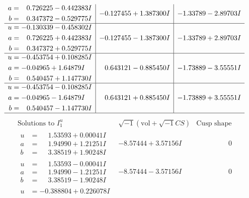\documentclass[1p]{elsarticle_modified}
\theoremstyle{definition}
\newcommand{\I}{\sqrt{-1}}
\begin{document}
$$\begin{array}{c|c|c}
\begin{aligned}
a &= \phantom{-}0.726225 - 0.442383 I \\
b &= \phantom{-}0.347372 - 0.529775 I\end{aligned}
 & -0.127455 + 1.387300 I & -1.33789 - 2.89703 I \\ \hline\begin{aligned}
u &= -0.130339 - 0.458302 I \\
a &= \phantom{-}0.726225 + 0.442383 I \\
b &= \phantom{-}0.347372 + 0.529775 I\end{aligned}
 & -0.127455 - 1.387300 I & -1.33789 + 2.89703 I \\ \hline\begin{aligned}
u &= -0.453754 + 0.108285 I \\
a &= -0.04965 + 1.64879 I \\
b &= \phantom{-}0.540457 + 1.147730 I\end{aligned}
 & \phantom{-}0.643121 - 0.885450 I & -1.73889 - 3.55551 I \\ \hline\begin{aligned}
u &= -0.453754 - 0.108285 I \\
a &= -0.04965 - 1.64879 I \\
b &= \phantom{-}0.540457 - 1.147730 I\end{aligned}
 & \phantom{-}0.643121 + 0.885450 I & -1.73889 + 3.55551 I\\
 \hline 
 \end{array}$$\newpage$$\begin{array}{c|c|c}  
\text{Solutions to }I^u_{1}& \I (\text{vol} + \sqrt{-1}CS) & \text{Cusp shape}\\
 \hline 
\begin{aligned}
u &= \phantom{-}1.53593 + 0.00041 I \\
a &= \phantom{-}1.94990 + 1.21251 I \\
b &= \phantom{-}3.38519 + 1.90248 I\end{aligned}
 & -8.57444 + 3.57156 I & \phantom{-0.000000 } 0 \\ \hline\begin{aligned}
u &= \phantom{-}1.53593 - 0.00041 I \\
a &= \phantom{-}1.94990 - 1.21251 I \\
b &= \phantom{-}3.38519 - 1.90248 I\end{aligned}
 & -8.57444 - 3.57156 I & \phantom{-0.000000 } 0 \\ \hline\begin{aligned}
u &= -0.388804 + 0.226078 I \\

\end{aligned}
\end{array}$$
\end{document}
